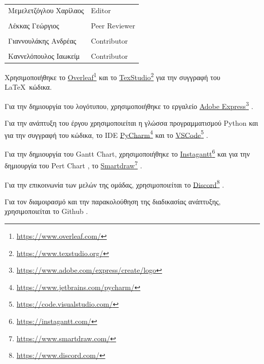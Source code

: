 \documentclass{../ol-softwaremanual}
\newcommand{\doclink}[2]{\href{#1}{#2}\footnote{\url{#1}}}
\begin{document}
	
	\vspace{20pt}
	
	\begin{table}[htbp!]
		\begin{tabular}{ll}
			Μεμελετζόγλου Χαρίλαος & \en Editor \\
			\\ Λέκκας Γεώργιος      &   \en  Peer Reviewer \\
			\\ Γιαννουλάκης Ανδρέας & \en Contributor \\
			\\ Καννελόπουλος Ιαωκείμ & \en Contributor \\ 
		\end{tabular}
	\end{table}
	
	
	\vspace{20pt}
	
	
	\vspace{20pt}
	\flushleft
	Χρησιμοποιήθηκε το \en \doclink{https://www.overleaf.com/}{Overleaf} \gr και το \en \doclink{https://www.texstudio.org/}{TexStudio} \gr για την συγγραφή του \LaTeX\ κώδικα. \break
	
	Για την δημιουργία του λογότυπου, χρησιμοποιήθηκε το εργαλείο \en \doclink{https://www.adobe.com/express/create/logo}{Adobe Express} . \gr \break
	
	Για την ανάπτυξη του έργου χρησιμοποιείται η γλώσσα προγραμματισμού \en Python \gr και για την συγγραφή του κώδικα, το \en IDE \doclink{https://www.jetbrains.com/pycharm/}{PyCharm} \gr και το \en \doclink{https://code.visualstudio.com/}{VSCode} \gr .         \\ \break
	
	Για την δημιουργία του \en Gantt Chart, \gr χρησιμοποιήθηκε το \en \doclink{https://instagantt.com/}{Instagantt}  \gr και για την δημιουργία του \en Pert Chart \gr, το \en \doclink{https://www.smartdraw.com/}{Smartdraw} \gr. \break
	
	Για την επικοινωνία των μελών της ομάδας, χρησιμοποιείται το \en \doclink{ https://www.discord.com/}{Discord} \gr . \linebreak 
	
	
	Για τον διαμοιρασμό και την παρακολούθηση της διαδικασίας ανάπτυξης, χρησιμοποιείται το \en Github \gr.
	
	
	
\end{document}
